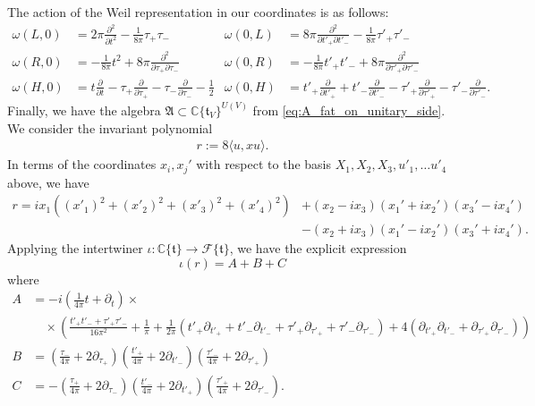 \documentclass[reqno, 11pt]{amsart} %
\numberwithin{equation}{section}
\theoremstyle{plain}
\theoremstyle{definition}
\theoremstyle{remark}
\newcommand{\mbC}{\mathbb{C}}
\newcommand{\mft}{\mathfrak{t}}
\newcommand{\bbC}{\mathbb C}
\newcommand{\calF}{\mathcal F}
\newcommand{\lie}[1]{ \mathfrak{#1}}
\begin{document}
The action of the Weil representation in our coordinates is as follows:
\begin{equation}\label{eq:Weil_rep_T11}
\begin{aligned}
\omega(L,0) &= 2 \pi \frac{\partial^2}{\partial t^2} - \frac{1}{8 \pi} \tau_+\tau_- & \omega(0,L) &= 8 \pi \frac{\partial^2}{\partial t'_+ \partial t'_-} - \frac{1}{8 \pi} \tau'_+ \tau'_- \\
\omega(R,0) &= -\frac{1}{8 \pi} t^2 + 8 \pi \frac{\partial^2}{\partial \tau_+ \partial \tau_-} &
\omega(0,R) &= - \frac{1}{8 \pi} t'_+ t'_- +  8 \pi \frac{\partial^2}{\partial \tau'_+ \partial \tau'_-} \\
\omega(H,0) &=  t\frac{ \partial }{\partial t} - \tau_+ \frac{\partial }{\partial \tau_+} - \tau_-\frac{\partial}{\partial \tau_-} - \frac12
&
\omega(0,H) &= t'_+\frac{ \partial }{\partial t'_+} + t'_-\frac{ \partial }{\partial t'_-} - \tau'_+ \frac{\partial}{\partial \tau'_+} - \tau'_- \frac{\partial}{\partial \tau'_-}.
\end{aligned}
\end{equation}
Finally, we have the algebra $\lie A \subset \mbC\{\mft_V\}^{U(V)}$ from \eqref{eq:A_fat_on_unitary_side}. We consider the invariant polynomial
 \begin{align*}
r := 8 \langle u, xu \rangle.
\end{align*}
In terms of the coordinates $x_i, x_j'$ with respect to the basis   $X_1, X_2, X_3, u'_1, \dots u'_4$ above, we have
$$\begin{aligned}
r
= i x_1 \left( (x'_1)^2 +( x'_2)^2 + (x'_3)^2 + (x'_4)^2 \right) & + (x_2 - i x_3)(x_1' + i x_2') (x_3' - i x_4')\\ & - (x_2 + i x_3)(x_1'-ix_2')(x_3'+ix_4').
\end{aligned}$$
Applying the intertwiner $\iota \colon \bbC\{ \lie t\} \to \calF\{ \lie t \}$, we have the explicit expression
\begin{equation} \label{eqn:iota r explicit}
\iota(r)  = A + B  + C
\end{equation}
where
\begin{align*}
A &= -i \left( \frac1{4\pi} t + \partial_t \right) \times\\
&\quad \times \left( \frac{ t'_+ t'_- + \tau'_+\tau'_-}{16 \pi^2}  + \frac{1}{\pi}   + \frac{1}{2 \pi} \left( t'_+ \partial_{t'_+} + t'_- \partial_{t'_-} + \tau'_+ \partial_{\tau'_+} + \tau'_- \partial_{\tau'_-} \right)  + 4 \left( \partial_{t'_+} \partial_{t'_-} + \partial_{\tau'_+} \partial_{\tau'_-}\right)\right) \\[1mm]
B &= \left( \frac{\tau_-}{4 \pi} + 2 \partial_{\tau_+} \right)  \left( \frac{t'_+}{4 \pi} + 2 \partial_{t'_-} \right)  \left( \frac{\tau'_-}{4 \pi} + 2 \partial_{\tau'_+} \right)  \\[1mm]
C &= -  \left( \frac{\tau_+}{4 \pi} + 2 \partial_{\tau_-} \right)  \left( \frac{t'_-}{4 \pi} + 2 \partial_{t'_+} \right)  \left( \frac{\tau'_+}{4 \pi} + 2 \partial_{\tau'_-} \right).
\end{align*}
 
\end{document}
